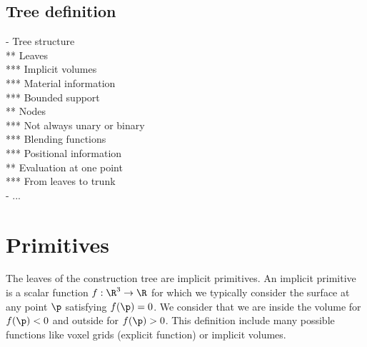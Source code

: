 

\subsection{Tree definition}
- Tree structure \\
** Leaves \\
*** Implicit volumes \\
*** Material information \\
*** Bounded support \\
** Nodes \\
*** Not always unary or binary \\
*** Blending functions \\
*** Positional information \\
** Evaluation at one point \\
*** From leaves to trunk \\
- ... 

\section{Primitives}
The leaves of the construction tree are implicit primitives. An implicit primitive is a scalar function $f: \R^3 \to \R$ for which we typically consider the surface at any point $\p$ satisfying $f(\p) = 0$. We consider that we are inside the volume for $f(\p) < 0$ and outside for $f(\p) > 0$. This definition include many possible functions like voxel grids (explicit function) or implicit volumes.

